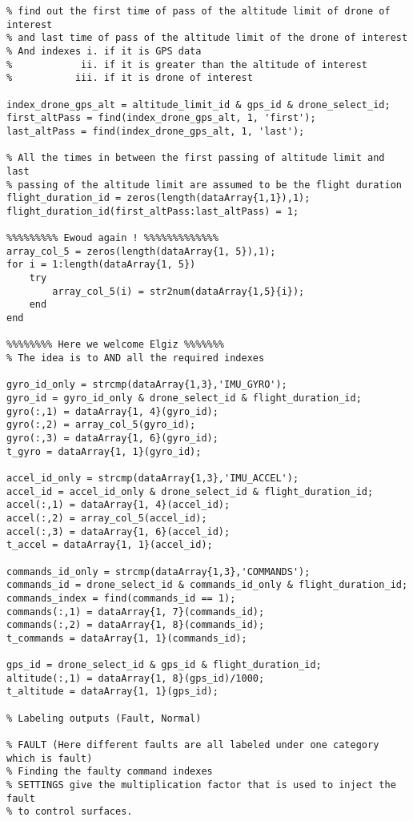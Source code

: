 \begin{lstlisting}
% find out the first time of pass of the altitude limit of drone of interest
% and last time of pass of the altitude limit of the drone of interest
% And indexes i. if it is GPS data
%            ii. if it is greater than the altitude of interest
%           iii. if it is drone of interest

index_drone_gps_alt = altitude_limit_id & gps_id & drone_select_id;
first_altPass = find(index_drone_gps_alt, 1, 'first');
last_altPass = find(index_drone_gps_alt, 1, 'last');

% All the times in between the first passing of altitude limit and last
% passing of the altitude limit are assumed to be the flight duration
flight_duration_id = zeros(length(dataArray{1,1}),1);
flight_duration_id(first_altPass:last_altPass) = 1;

%%%%%%%%% Ewoud again ! %%%%%%%%%%%%%
array_col_5 = zeros(length(dataArray{1, 5}),1);
for i = 1:length(dataArray{1, 5})
    try
        array_col_5(i) = str2num(dataArray{1,5}{i});
    end
end

%%%%%%%% Here we welcome Elgiz %%%%%%%
% The idea is to AND all the required indexes

gyro_id_only = strcmp(dataArray{1,3},'IMU_GYRO');
gyro_id = gyro_id_only & drone_select_id & flight_duration_id;
gyro(:,1) = dataArray{1, 4}(gyro_id);
gyro(:,2) = array_col_5(gyro_id);
gyro(:,3) = dataArray{1, 6}(gyro_id);
t_gyro = dataArray{1, 1}(gyro_id);

accel_id_only = strcmp(dataArray{1,3},'IMU_ACCEL');
accel_id = accel_id_only & drone_select_id & flight_duration_id;
accel(:,1) = dataArray{1, 4}(accel_id);
accel(:,2) = array_col_5(accel_id);
accel(:,3) = dataArray{1, 6}(accel_id);
t_accel = dataArray{1, 1}(accel_id);

commands_id_only = strcmp(dataArray{1,3},'COMMANDS');
commands_id = drone_select_id & commands_id_only & flight_duration_id;
commands_index = find(commands_id == 1);
commands(:,1) = dataArray{1, 7}(commands_id);
commands(:,2) = dataArray{1, 8}(commands_id);
t_commands = dataArray{1, 1}(commands_id);

gps_id = drone_select_id & gps_id & flight_duration_id;
altitude(:,1) = dataArray{1, 8}(gps_id)/1000;
t_altitude = dataArray{1, 1}(gps_id);

% Labeling outputs (Fault, Normal)

% FAULT (Here different faults are all labeled under one category which is fault) 
% Finding the faulty command indexes
% SETTINGS give the multiplication factor that is used to inject the fault
% to control surfaces. 


\end{lstlisting}
